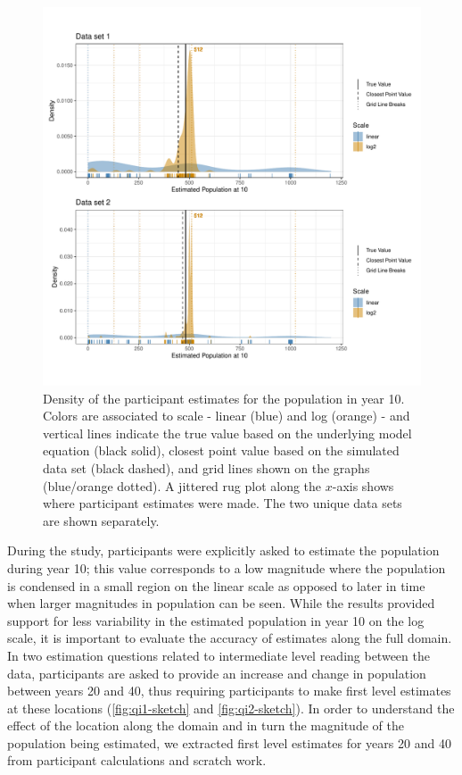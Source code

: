 \documentclass[print]{nuthesis}
\begin{document}
\begin{figure}[tbp]

{\centering \includegraphics[width=1\linewidth,]{thesis_files/figure-latex/qe1-density-plot-10-all-1} 

}

\caption[Elementary Q1 density in year 10]{Density of the participant estimates for the population in year 10. Colors are associated to scale - linear (blue) and log (orange) - and vertical lines indicate the true value based on the underlying model equation (black solid), closest point value based on the simulated data set (black dashed), and grid lines shown on the graphs (blue/orange dotted). A jittered rug plot along the $x$-axis shows where participant estimates were made. The two unique data sets are shown separately.}\label{fig:qe1-density-plot-10-all}
\end{figure}

During the study, participants were explicitly asked to estimate the population during year 10; this value corresponds to a low magnitude where the population is condensed in a small region on the linear scale as opposed to later in time when larger magnitudes in population can be seen.
While the results provided support for less variability in the estimated population in year 10 on the log scale, it is important to evaluate the accuracy of estimates along the full domain.
In two estimation questions related to intermediate level reading between the data, participants are asked to provide an increase and change in population between years 20 and 40, thus requiring participants to make first level estimates at these locations (\cref{fig:qi1-sketch} and \cref{fig:qi2-sketch}).
In order to understand the effect of the location along the domain and in turn the magnitude of the population being estimated, we extracted first level estimates for years 20 and 40 from participant calculations and scratch work.
\end{document}
